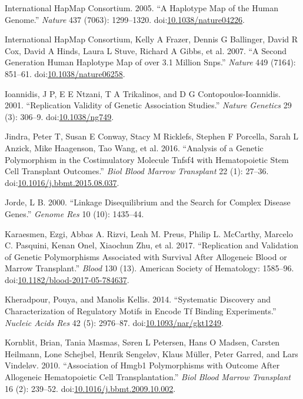 \documentclass[]{DissertateOSU}
\begin{document}
\hypertarget{ref-hapmap_2005}{}
International HapMap Consortium. 2005. ``A Haplotype Map of the Human
Genome.'' \emph{Nature} 437 (7063): 1299--1320.
doi:\href{https://doi.org/10.1038/nature04226}{10.1038/nature04226}.

\hypertarget{ref-hapmap_2007}{}
International HapMap Consortium, Kelly A Frazer, Dennis G Ballinger,
David R Cox, David A Hinds, Laura L Stuve, Richard A Gibbs, et al. 2007.
``A Second Generation Human Haplotype Map of over 3.1 Million Snps.''
\emph{Nature} 449 (7164): 851--61.
doi:\href{https://doi.org/10.1038/nature06258}{10.1038/nature06258}.

\hypertarget{ref-Ioannidis_2001}{}
Ioannidis, J P, E E Ntzani, T A Trikalinos, and D G
Contopoulos-Ioannidis. 2001. ``Replication Validity of Genetic
Association Studies.'' \emph{Nature Genetics} 29 (3): 306--9.
doi:\href{https://doi.org/10.1038/ng749}{10.1038/ng749}.

\hypertarget{ref-jindra_2016}{}
Jindra, Peter T, Susan E Conway, Stacy M Ricklefs, Stephen F Porcella,
Sarah L Anzick, Mike Haagenson, Tao Wang, et al. 2016. ``Analysis of a
Genetic Polymorphism in the Costimulatory Molecule Tnfsf4 with
Hematopoietic Stem Cell Transplant Outcomes.'' \emph{Biol Blood Marrow
Transplant} 22 (1): 27--36.
doi:\href{https://doi.org/10.1016/j.bbmt.2015.08.037}{10.1016/j.bbmt.2015.08.037}.

\hypertarget{ref-Jorde_2000}{}
Jorde, L B. 2000. ``Linkage Disequilibrium and the Search for Complex
Disease Genes.'' \emph{Genome Res} 10 (10): 1435--44.

\hypertarget{ref-Karaesmen_2017}{}
Karaesmen, Ezgi, Abbas A. Rizvi, Leah M. Preus, Philip L. McCarthy,
Marcelo C. Pasquini, Kenan Onel, Xiaochun Zhu, et al. 2017.
``Replication and Validation of Genetic Polymorphisms Associated with
Survival After Allogeneic Blood or Marrow Transplant.'' \emph{Blood} 130
(13). American Society of Hematology: 1585--96.
doi:\href{https://doi.org/10.1182/blood-2017-05-784637}{10.1182/blood-2017-05-784637}.

\hypertarget{ref-motifs_2014}{}
Kheradpour, Pouya, and Manolis Kellis. 2014. ``Systematic Discovery and
Characterization of Regulatory Motifs in Encode Tf Binding
Experiments.'' \emph{Nucleic Acids Res} 42 (5): 2976--87.
doi:\href{https://doi.org/10.1093/nar/gkt1249}{10.1093/nar/gkt1249}.

\hypertarget{ref-kornblit_2010}{}
Kornblit, Brian, Tania Masmas, Søren L Petersen, Hans O Madsen, Carsten
Heilmann, Lone Schejbel, Henrik Sengeløv, Klaus Müller, Peter Garred,
and Lars Vindeløv. 2010. ``Association of Hmgb1 Polymorphisms with
Outcome After Allogeneic Hematopoietic Cell Transplantation.''
\emph{Biol Blood Marrow Transplant} 16 (2): 239--52.
doi:\href{https://doi.org/10.1016/j.bbmt.2009.10.002}{10.1016/j.bbmt.2009.10.002}.
\end{document}

